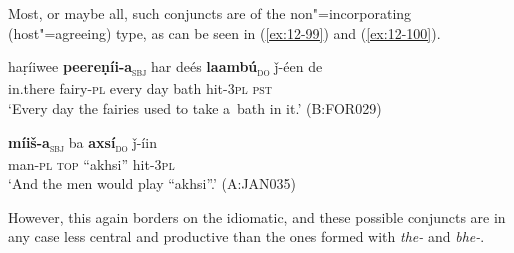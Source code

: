 Most, or maybe all, such conjuncts are of the non"=incorporating (host"=agreeing) type, as can be seen in (\ref{ex:12-99}) and (\ref{ex:12-100}). 

\begin{exe}
\ex
\label{ex:12-99}
\gll haṛíiwee {\ob}\textbf{peereṇíi-a}{\cb}\textsubscript{\textsc{\upshape sbj}} har deés {\ob}\textbf{laambú}{\cb}\textsubscript{\textsc{\upshape do}} ǰ-éen de\\
in.there fairy-\textsc{pl} every day bath hit-\textsc{3pl} \textsc{pst}\\
\glt `Every day the fairies used to take a~bath in it.' (B:FOR029)
\end{exe}
\begin{exe}
\ex
\label{ex:12-100}
\gll {\ob}\textbf{míiš-a}{\cb}\textsubscript{\textsc{\upshape sbj}} ba {\ob}\textbf{axsí}{\cb}\textsubscript{\textsc{\upshape do}} ǰ-íin\\
man-\textsc{pl} \textsc{top} ``akhsi'' hit-\textsc{3pl}\\
\glt `And the men would play ``akhsi''.' (A:JAN035)
\end{exe}

However, this again borders on the idiomatic, and these possible conjuncts are in any case less central and productive than the ones formed with \textit{the-} and \textit{bhe-}.
